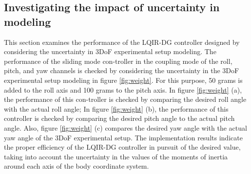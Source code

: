 \documentclass[3p,times]{elsarticle}
\begin{document}
\subsection{Investigating the impact of uncertainty in modeling }
This section examines the performance of the LQIR-DG controller designed by considering the uncertainty in 3DoF experimental setup modeling. The performance of the sliding mode con-troller in the coupling mode of the roll, pitch, and yaw channels is checked by considering the uncertainty in the 3DoF experimental setup modeling in figure \ref{fig:weight}. For this purpose, 50 grams is added to the roll axis and 100 grams to the pitch axis. In figure \ref{fig:weight} (a), the performance of this con-troller is checked by comparing the desired roll angle with the actual roll angle; In figure \ref{fig:weight} (b), the performance of this controller is checked by comparing the desired pitch angle to the actual pitch angle. Also, figure \ref{fig:weight} (c) compares the desired yaw angle with the actual yaw angle of the 3DoF experimental setup. The implementation results indicate the proper efficiency of the LQIR-DG controller in pursuit of the desired value, taking into account the uncertainty in the values of the moments of inertia around each axis of the body coordinate system.
\end{document}
